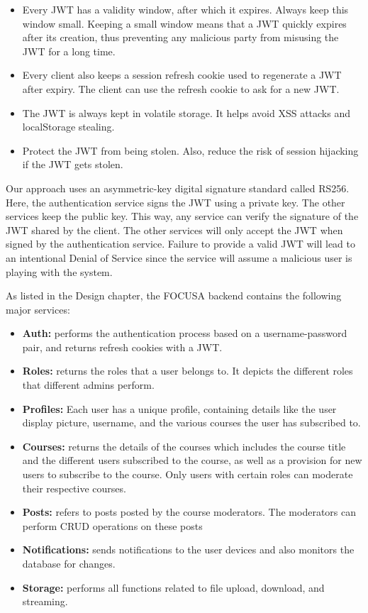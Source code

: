 \begin{itemize}
    \item Every JWT has a validity window, after which it expires. Always keep this window small. 
    Keeping a small window means that a JWT quickly expires after its creation, thus preventing any malicious party from misusing the JWT for a long time.
    \item Every client also keeps a session refresh cookie used to regenerate a JWT after expiry. The client can use the refresh cookie to ask for a new JWT.
    \item The JWT is always kept in volatile storage. It helps avoid XSS attacks and localStorage stealing.
    \item Protect the JWT from being stolen. Also, reduce the risk of session hijacking if the JWT gets stolen.
\end{itemize}

Our approach uses an asymmetric-key digital signature standard called RS256. Here, the authentication service signs the JWT using a private key. The other services keep the public key. This way, any service can verify the signature of the JWT shared by the client. The other services will only accept the JWT when signed by the authentication service. 
Failure to provide a valid JWT will lead to an intentional Denial of Service since the service will assume a malicious user is playing with the system.

As listed in the Design chapter, the FOCUSA backend contains the following major services:
\begin{itemize}
    \item \textbf{Auth:} performs the authentication process based on a username-password pair, and returns refresh cookies with a JWT.
    \item \textbf{Roles:}  returns the roles that a user belongs to. It depicts the different roles that different admins perform.
    \item \textbf{Profiles:} Each user has a unique profile, containing details like the user display picture, username, and the various courses the user has subscribed to.
    \item \textbf{Courses:}  returns the details of the courses which includes the course title and the different users subscribed to the course, as well as a provision for new users to subscribe to the course. Only users with certain roles can moderate their respective courses.
    \item \textbf{Posts:} refers to posts posted by the course moderators. The moderators can perform CRUD operations on these posts
    \item \textbf{Notifications:}  sends notifications to the user devices and also monitors the database for changes.
    \item \textbf{Storage:} performs all functions related to file upload, download, and streaming.
\end{itemize}

